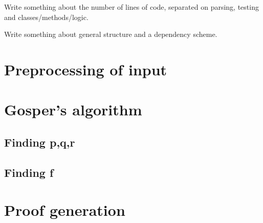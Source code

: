 Write something about the number of lines of code, separated on parsing, testing and classes/methods/logic.

Write something about general structure and a dependency scheme.
\section{Preprocessing of input}
\section{Gosper's algorithm}
\subsection{Finding p,q,r}
\subsection{Finding f}
\section{Proof generation}
